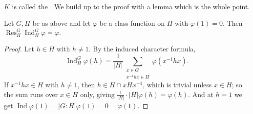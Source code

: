 \documentclass[a4paper]{scrartcl}
\newcommand{\Ind}{\operatorname{Ind}}
\newcommand{\Res}{\operatorname{Res}}
\begin{document}
$K$ is called the . We build up to the proof with a lemma which is the whole point.

\begin{lemma}
	Let $G, H$ be as above and let $\varphi$ be a class function on $H$ with $\varphi(1) = 0$. Then $\Res^G_H\Ind_H^G\varphi = \varphi$.
\end{lemma}
\begin{proof}
	Let $h \in H$ with $h\neq 1$. By the induced character formula,
	$$\Ind_H^G\varphi(h) = \frac1{|H|}\sum_{\substack{x\in G\\ x^{-1}hx\in H}}\varphi(x^{-1}hx).$$
	If $x^{-1}hx \in H$ with $h\neq 1$, then $h\in H\cap xHx^{-1}$, which is trivial unless $x\in H$; so the sum runs over $x\in H$ only, giving $\frac1{|H|}\cdot|H|\varphi(h) = \varphi(h)$. And at $h = 1$ we get $\Ind\varphi(1) = |G:H|\varphi(1) = 0 = \varphi(1)$.
\end{proof}
\end{document}
